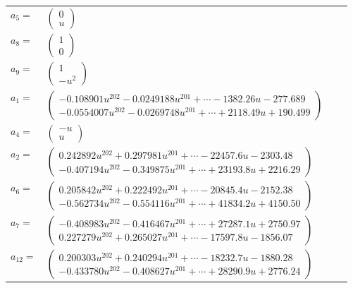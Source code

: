 \documentclass[1p]{elsarticle_modified}
\theoremstyle{definition}
\begin{document}
\begin{tabular}{m{7pt} m{180pt} m{7pt} m{180pt} }
\flushright $a_{5}=$&$\begin{pmatrix}0\\u\end{pmatrix}$ \\
\flushright $a_{8}=$&$\begin{pmatrix}1\\0\end{pmatrix}$ \\
\flushright $a_{9}=$&$\begin{pmatrix}1\\- u^2\end{pmatrix}$ \\
\flushright $a_{1}=$&$\begin{pmatrix}-0.108901 u^{202}-0.0249188 u^{201}+\cdots-1382.26 u-277.689\\-0.0554007 u^{202}-0.0269748 u^{201}+\cdots+2118.49 u+190.499\end{pmatrix}$ \\
\flushright $a_{4}=$&$\begin{pmatrix}- u\\u\end{pmatrix}$ \\
\flushright $a_{2}=$&$\begin{pmatrix}0.242892 u^{202}+0.297981 u^{201}+\cdots-22457.6 u-2303.48\\-0.407194 u^{202}-0.349875 u^{201}+\cdots+23193.8 u+2216.29\end{pmatrix}$ \\
\flushright $a_{6}=$&$\begin{pmatrix}0.205842 u^{202}+0.222492 u^{201}+\cdots-20845.4 u-2152.38\\-0.562734 u^{202}-0.554116 u^{201}+\cdots+41834.2 u+4150.50\end{pmatrix}$ \\
\flushright $a_{7}=$&$\begin{pmatrix}-0.408983 u^{202}-0.416467 u^{201}+\cdots+27287.1 u+2750.97\\0.227279 u^{202}+0.265027 u^{201}+\cdots-17597.8 u-1856.07\end{pmatrix}$ \\
\flushright $a_{12}=$&$\begin{pmatrix}0.200303 u^{202}+0.240294 u^{201}+\cdots-18232.7 u-1880.28\\-0.433780 u^{202}-0.408627 u^{201}+\cdots+28290.9 u+2776.24\end{pmatrix}$ \\

\end{tabular}
\end{document}
